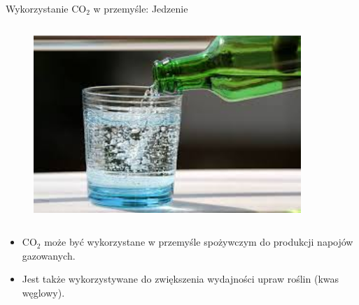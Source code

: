 \begin{columnframe}{Wykorzystanie CO$_2$ w przemyśle: Jedzenie}
    \begin{column}{0.5\textwidth}
        \begin{figure}
            \centering
            \includegraphics[width=0.9\textwidth, frame]{images/carbonated_water_stock_image.jpg}
        \end{figure}
    \end{column}
    \begin{column}{0.5\textwidth}
        \begin{itemize}
            \item CO$_2$ może być wykorzystane w przemyśle spożywczym do produkcji napojów gazowanych.
            \item Jest także wykorzystywane do zwiększenia wydajności upraw roślin (kwas węglowy).
        \end{itemize}
    \end{column}
\end{columnframe}

